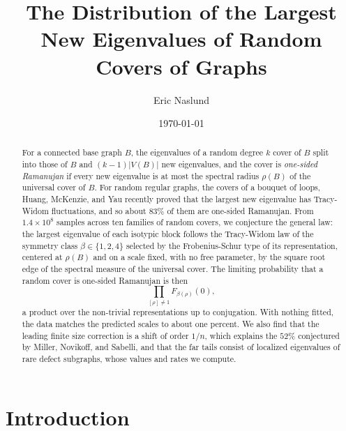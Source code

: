\documentclass[12pt,oneside,english]{amsart}
\numberwithin{equation}{section}
\numberwithin{figure}{section}
\numberwithin{table}{section}
\theoremstyle{plain}
\numberwithin{thm}{section}
\theoremstyle{plain}
\theoremstyle{plain}
\theoremstyle{plain}
\theoremstyle{definition}
\theoremstyle{definition}
\theoremstyle{definition}
\theoremstyle{remark}
\begin{document}
\title[Largest New Eigenvalues of Random Covers]{The Distribution of the Largest New Eigenvalues of Random Covers
of Graphs}
\author{Eric Naslund}

\begin{abstract}
For a connected base graph $B$, the eigenvalues of a random degree
$k$ cover of $B$ split into those of $B$ and $(k-1)\left|V(B)\right|$
new eigenvalues, and the cover is \emph{one-sided Ramanujan} if every
new eigenvalue is at most the spectral radius $\rho(B)$ of the universal
cover of $B$. For random regular graphs, the covers of a bouquet of
loops, Huang, McKenzie, and Yau recently proved that the largest new
eigenvalue has Tracy-Widom fluctuations, and so about $83\%$ of them
are one-sided Ramanujan. From $1.4\times10^{8}$ samples across ten
families of random covers, we conjecture the general law: the largest
eigenvalue of each isotypic block follows the Tracy-Widom law of the
symmetry class $\beta\in\{1,2,4\}$ selected by the Frobenius-Schur
type of its representation, centered at $\rho(B)$ and on a scale
fixed, with no free parameter, by the square root edge of the spectral
measure of the universal cover. The limiting probability that a random
cover is one-sided Ramanujan is then
\[
\prod_{[\rho]\neq1}F_{\beta(\rho)}(0),
\]
a product over the non-trivial representations up to conjugation.
With nothing fitted, the data matches the predicted scales to about
one percent. We also find that the leading finite size correction
is a shift of order $1/n$, which explains the $52\%$ conjectured by
Miller, Novikoff, and Sabelli, and that the far tails consist of localized
eigenvalues of rare defect subgraphs, whose values and rates we compute.
\end{abstract}

\date{\today}
\maketitle

\section{Introduction}
\end{document}
